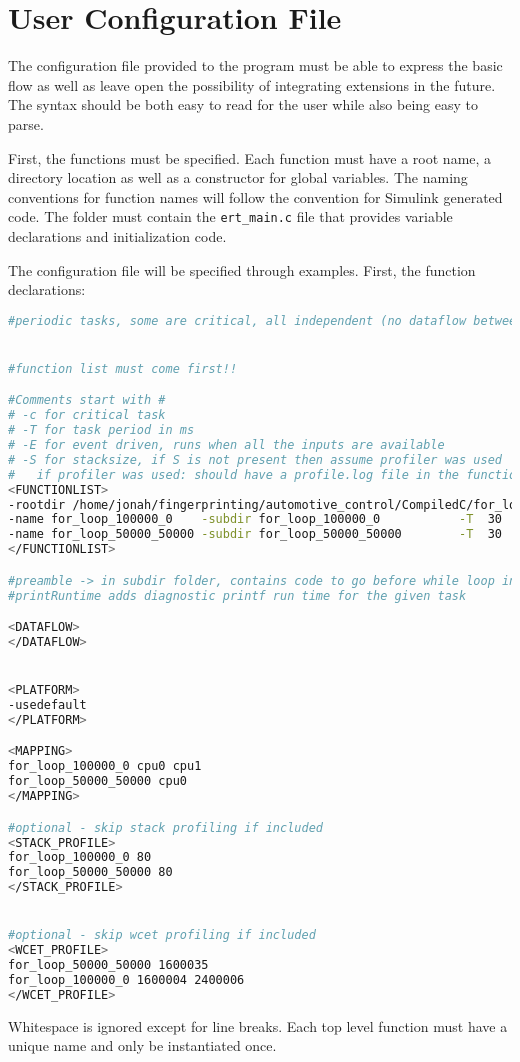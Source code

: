 
\chapter{User Configuration File} %

\label{AppendixA} %


The configuration file provided to the program must be able to express the basic flow as well as leave open the possibility of integrating extensions in the future. The syntax should be both easy to read for the user while also being easy to parse.

First, the functions must be specified. Each function must have a root name, a directory location as well as a constructor for global variables. The naming conventions for function names will follow the convention for Simulink generated code. The folder must contain the \texttt{ert\_main.c} file that provides variable declarations and initialization code.

The configuration file will be specified through examples. First, the function declarations:

\begin{lstlisting}[caption={Function configuration syntax},label=l:config-function,language=bash]
#periodic tasks, some are critical, all independent (no dataflow between tasks)


#function list must come first!!

#Comments start with #
# -c for critical task
# -T for task period in ms
# -E for event driven, runs when all the inputs are available
# -S for stacksize, if S is not present then assume profiler was used
# 	if profiler was used: should have a profile.log file in the function folders
<FUNCTIONLIST>
-rootdir /home/jonah/fingerprinting/automotive_control/CompiledC/for_loops
-name for_loop_100000_0    -subdir for_loop_100000_0           -T  30   -c  -Priority 2	
-name for_loop_50000_50000 -subdir for_loop_50000_50000		   -T  30       -Priority 1 -printRuntime -addPreamble preamble.txt
</FUNCTIONLIST>

#preamble -> in subdir folder, contains code to go before while loop in task, used for threadsafe newlib config, should not have extension .c or .h
#printRuntime adds diagnostic printf run time for the given task

<DATAFLOW>
</DATAFLOW>


<PLATFORM>
-usedefault
</PLATFORM>

<MAPPING>
for_loop_100000_0 cpu0 cpu1
for_loop_50000_50000 cpu0
</MAPPING>

#optional - skip stack profiling if included
<STACK_PROFILE>
for_loop_100000_0 80
for_loop_50000_50000 80
</STACK_PROFILE>


#optional - skip wcet profiling if included
<WCET_PROFILE>
for_loop_50000_50000 1600035
for_loop_100000_0 1600004 2400006
</WCET_PROFILE>
\end{lstlisting}


Whitespace is ignored except for line breaks. Each top level function must have a unique name and only be instantiated once.
